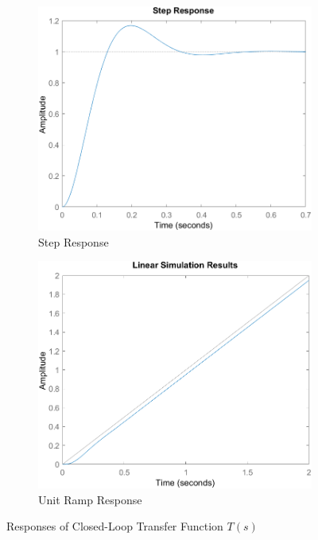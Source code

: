 \documentclass[12pt]{article}
\begin{document}
\begin{figure}[h!]
	\centering
	\begin{subfigure}[b]{0.47\textwidth}
		\includegraphics[width=\textwidth]{step_response}
		\caption{\label{fig:step_response}Step Response}
	\end{subfigure}
	\begin{subfigure}[b]{0.47\textwidth}
		\includegraphics[width=\textwidth]{unit_ramp_response}
		\caption{\label{fig:unit_ramp_response}Unit Ramp Response}
	\end{subfigure}
	\caption{Responses of Closed-Loop Transfer Function $T(s)$}
\end{figure}
\end{document}

